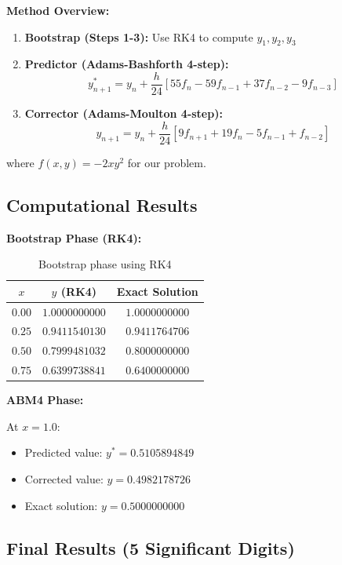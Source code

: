 \textbf{Method Overview:}
\begin{enumerate}
    \item \textbf{Bootstrap (Steps 1-3):} Use RK4 to compute $y_1, y_2, y_3$
    \item \textbf{Predictor (Adams-Bashforth 4-step):}
    $$y^*_{n+1} = y_n + \frac{h}{24}[55f_n - 59f_{n-1} + 37f_{n-2} - 9f_{n-3}]$$
    \item \textbf{Corrector (Adams-Moulton 4-step):}
    $$y_{n+1} = y_n + \frac{h}{24}[9f_{n+1} + 19f_n - 5f_{n-1} + f_{n-2}]$$
\end{enumerate}

where $f(x, y) = -2xy^2$ for our problem.

\subsection*{Computational Results}

\textbf{Bootstrap Phase (RK4):}

\begin{table}[h]
\centering
\begin{tabular}{ccc}
\toprule
$x$ & $y$ (RK4) & Exact Solution \\
\midrule
$0.00$ & $1.0000000000$ & $1.0000000000$ \\
$0.25$ & $0.9411540130$ & $0.9411764706$ \\
$0.50$ & $0.7999481032$ & $0.8000000000$ \\
$0.75$ & $0.6399738841$ & $0.6400000000$ \\
\bottomrule
\end{tabular}
\caption{Bootstrap phase using RK4}
\end{table}

\textbf{ABM4 Phase:}

At $x = 1.0$:
\begin{itemize}
    \item Predicted value: $y^* = 0.5105894849$
    \item Corrected value: $y = 0.4982178726$
    \item Exact solution: $y = 0.5000000000$
\end{itemize}

\subsection*{Final Results (5 Significant Digits)}

